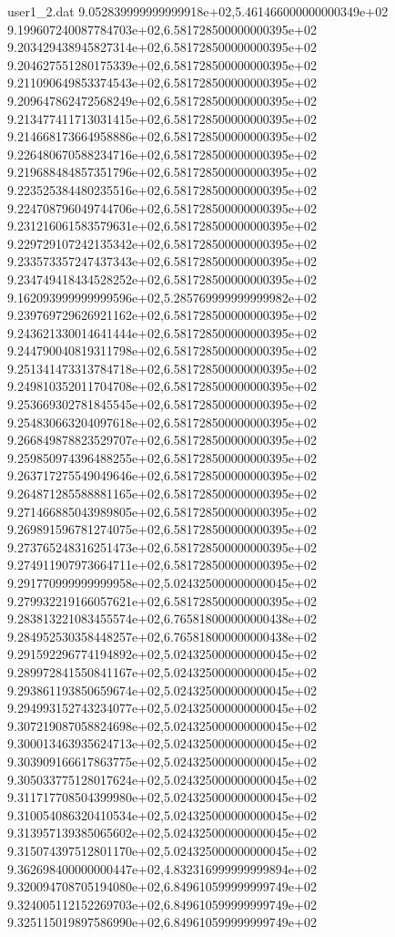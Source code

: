 \begin{filecontents}{user1_2.dat}
9.052839999999999918e+02,5.461466000000000349e+02
9.199607240087784703e+02,6.581728500000000395e+02
9.203429438945827314e+02,6.581728500000000395e+02
9.204627551280175339e+02,6.581728500000000395e+02
9.211090649853374543e+02,6.581728500000000395e+02
9.209647862472568249e+02,6.581728500000000395e+02
9.213477411713031415e+02,6.581728500000000395e+02
9.214668173664958886e+02,6.581728500000000395e+02
9.226480670588234716e+02,6.581728500000000395e+02
9.219688484857351796e+02,6.581728500000000395e+02
9.223525384480235516e+02,6.581728500000000395e+02
9.224708796049744706e+02,6.581728500000000395e+02
9.231216061583579631e+02,6.581728500000000395e+02
9.229729107242135342e+02,6.581728500000000395e+02
9.233573357247437343e+02,6.581728500000000395e+02
9.234749418434528252e+02,6.581728500000000395e+02
9.162093999999999596e+02,5.285769999999999982e+02
9.239769729626921162e+02,6.581728500000000395e+02
9.243621330014641444e+02,6.581728500000000395e+02
9.244790040819311798e+02,6.581728500000000395e+02
9.251341473313784718e+02,6.581728500000000395e+02
9.249810352011704708e+02,6.581728500000000395e+02
9.253669302781845545e+02,6.581728500000000395e+02
9.254830663204097618e+02,6.581728500000000395e+02
9.266849878823529707e+02,6.581728500000000395e+02
9.259850974396488255e+02,6.581728500000000395e+02
9.263717275549049646e+02,6.581728500000000395e+02
9.264871285588881165e+02,6.581728500000000395e+02
9.271466885043989805e+02,6.581728500000000395e+02
9.269891596781274075e+02,6.581728500000000395e+02
9.273765248316251473e+02,6.581728500000000395e+02
9.274911907973664711e+02,6.581728500000000395e+02
9.291770999999999958e+02,5.024325000000000045e+02
9.279932219166057621e+02,6.581728500000000395e+02
9.283813221083455574e+02,6.765818000000000438e+02
9.284952530358448257e+02,6.765818000000000438e+02
9.291592296774194892e+02,5.024325000000000045e+02
9.289972841550841167e+02,5.024325000000000045e+02
9.293861193850659674e+02,5.024325000000000045e+02
9.294993152743234077e+02,5.024325000000000045e+02
9.307219087058824698e+02,5.024325000000000045e+02
9.300013463935624713e+02,5.024325000000000045e+02
9.303909166617863775e+02,5.024325000000000045e+02
9.305033775128017624e+02,5.024325000000000045e+02
9.311717708504399980e+02,5.024325000000000045e+02
9.310054086320410534e+02,5.024325000000000045e+02
9.313957139385065602e+02,5.024325000000000045e+02
9.315074397512801170e+02,5.024325000000000045e+02
9.362698400000000447e+02,4.832316999999999894e+02
9.320094708705194080e+02,6.849610599999999749e+02
9.324005112152269703e+02,6.849610599999999749e+02
9.325115019897586990e+02,6.849610599999999749e+02

\end{filecontents}
